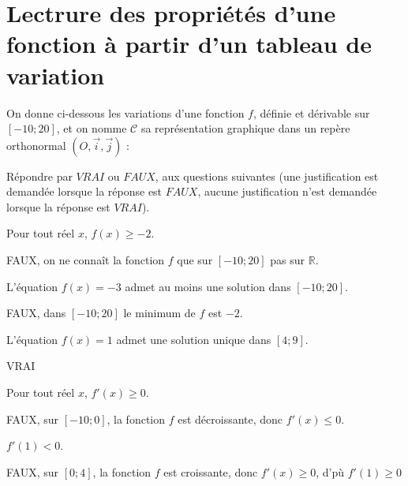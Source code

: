 \section{Lectrure des propriétés d'une fonction à partir d'un tableau de variation}

On donne ci-dessous les variations d'une fonction $f$, définie et dérivable sur $[-10;20]$, et on nomme $\mathcal{C}$ sa représentation graphique dans un repère orthonormal $(O, \vec{i}, \vec{j})$ :

Répondre par $VRAI$ ou $FAUX$, aux questions suivantes (une justification est demandée lorsque la réponse est $FAUX$, aucune justification n'est demandée lorsque la réponse est $VRAI$).



\begin{questions}
	\question[1]  Pour tout réel $x$, $f(x) \ge -2$.
	\begin{solution}
		FAUX, on ne connaît la fonction $f$ que sur $[-10;20]$ pas sur $\mathbb{R}$.
	\end{solution}
	\question[1]  L'équation $f(x)=-3$ admet au moins une solution dans $[-10;20]$.
	\begin{solution}
		FAUX, dans $[-10;20]$ le minimum de $f$ est $-2$.
	\end{solution}
	\question[1] L'équation $f(x)=1$ admet une solution unique dans $[4;9]$.
	\begin{solution}
		VRAI
	\end{solution}
	\question[1] Pour tout réel $x$, $f'(x)\ge 0$.
	 \begin{solution}
	 	FAUX, sur $[-10;0]$, la fonction $f$ est décroissante, donc $f'(x) \le 0$.
	 \end{solution}
	\question[1] $f'(1)<0$.
	\begin{solution}
		FAUX, sur $[0;4]$, la fonction $f$ est croissante, donc $f'(x)\ge 0$, d'pù $f'(1) \ge 0$
	\end{solution}
\end{questions}